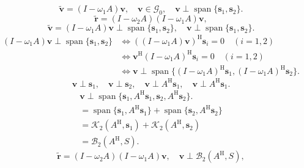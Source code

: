 \begin{equation}\label{eq:idr-first-level-preimage}\widetilde{\bm v}=(I-\omega_1A)\bm v,\quad\bm v\in\mathcal G_0,\quad\bm v\perp\operatorname{span}\{\bm s_1,\bm s_2\}.\end{equation}
\begin{equation}\label{eq:idr-two-factor-residual}\widetilde{\bm r}=(I-\omega_2A)(I-\omega_1A)\bm v,\end{equation}
\[\widetilde{\bm v}=(I-\omega_1A)\bm v\perp\operatorname{span}\{\bm s_1,\bm s_2\},\quad\bm v\perp\operatorname{span}\{\bm s_1,\bm s_2\}.\]
\[\begin{aligned}(I-\omega_1A)\bm v\perp\operatorname{span}\{\bm s_1,\bm s_2\}&\Leftrightarrow((I-\omega_1A)\bm v)^{\mathrm H}\bm s_i=0\quad(i=1,2)\\&\Leftrightarrow\bm v^{\mathrm H}(I-\omega_1A)^{\mathrm H}\bm s_i=0\quad(i=1,2)\\&\Leftrightarrow\bm v\perp\operatorname{span}\{(I-\omega_1A)^{\mathrm H}\bm s_1,(I-\omega_1A)^{\mathrm H}\bm s_2\}.\end{aligned}\]
\[\bm v\perp\bm s_1,\quad\bm v\perp\bm s_2,\quad\bm v\perp A^{\mathrm H}\bm s_1,\quad\bm v\perp A^{\mathrm H}\bm s_1.\]
\[\begin{aligned}\bm v\perp\operatorname{span}\{\bm s_1,A^{\mathrm H}\bm s_1,\bm s_2,A^{\mathrm H}\bm s_2\}.\\=\operatorname{span}\{\bm s_1,A^{\mathrm H}\bm s_1\}+\operatorname{span}\{\bm s_2,A^{\mathrm H}\bm s_2\}\\=\mathcal K_2(A^{\mathrm H},\bm s_1)+\mathcal K_2(A^{\mathrm H},\bm s_2)\\=\mathcal B_2(A^{\mathrm H},S).\end{aligned}\]
\begin{equation}\label{eq:idr-second-level-block-orthogonality}\widetilde{\bm r}=(I-\omega_2A)(I-\omega_1A)\bm v,\quad\bm v\perp\mathcal B_2(A^{\mathrm H},S),\end{equation}
